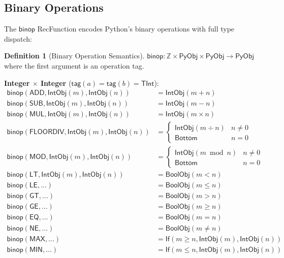 \documentclass[11pt,a4paper]{report}
\theoremstyle{definition}
\newtheorem{definition}{Definition}[chapter]
\theoremstyle{plain}
\newcommand{\Int}{\mathbb{Z}}
\newcommand{\PyObj}{\mathsf{PyObj}}
\begin{document}
\subsection{Binary Operations}

The $\mathsf{binop}$ RecFunction encodes Python's binary operations
with full type dispatch:

\begin{definition}[Binary Operation Semantics]
$\mathsf{binop} : \Int \times \PyObj \times \PyObj \to \PyObj$
where the first argument is an operation tag.

\textbf{Integer $\times$ Integer} ($\mathsf{tag}(a) = \mathsf{tag}(b)
= \mathsf{TInt}$):
\begin{align}
  \mathsf{binop}(\mathsf{ADD}, \mathsf{IntObj}(m),
    \mathsf{IntObj}(n)) &= \mathsf{IntObj}(m + n) \\
  \mathsf{binop}(\mathsf{SUB}, \mathsf{IntObj}(m),
    \mathsf{IntObj}(n)) &= \mathsf{IntObj}(m - n) \\
  \mathsf{binop}(\mathsf{MUL}, \mathsf{IntObj}(m),
    \mathsf{IntObj}(n)) &= \mathsf{IntObj}(m \times n) \\
  \mathsf{binop}(\mathsf{FLOORDIV}, \mathsf{IntObj}(m),
    \mathsf{IntObj}(n)) &= \begin{cases}
      \mathsf{IntObj}(m \div n) & n \neq 0 \\
      \mathsf{Bottom} & n = 0
    \end{cases} \\
  \mathsf{binop}(\mathsf{MOD}, \mathsf{IntObj}(m),
    \mathsf{IntObj}(n)) &= \begin{cases}
      \mathsf{IntObj}(m \bmod n) & n \neq 0 \\
      \mathsf{Bottom} & n = 0
    \end{cases} \\
  \mathsf{binop}(\mathsf{LT}, \mathsf{IntObj}(m),
    \mathsf{IntObj}(n)) &= \mathsf{BoolObj}(m < n) \\
  \mathsf{binop}(\mathsf{LE}, \ldots) &= \mathsf{BoolObj}(m \leq n) \\
  \mathsf{binop}(\mathsf{GT}, \ldots) &= \mathsf{BoolObj}(m > n) \\
  \mathsf{binop}(\mathsf{GE}, \ldots) &= \mathsf{BoolObj}(m \geq n) \\
  \mathsf{binop}(\mathsf{EQ}, \ldots) &= \mathsf{BoolObj}(m = n) \\
  \mathsf{binop}(\mathsf{NE}, \ldots) &= \mathsf{BoolObj}(m \neq n) \\
  \mathsf{binop}(\mathsf{MAX}, \ldots) &= \mathsf{If}(m \geq n,
    \mathsf{IntObj}(m), \mathsf{IntObj}(n)) \\
  \mathsf{binop}(\mathsf{MIN}, \ldots) &= \mathsf{If}(m \leq n,
    \mathsf{IntObj}(m), \mathsf{IntObj}(n))
\end{align}


\end{definition}
\end{document}
